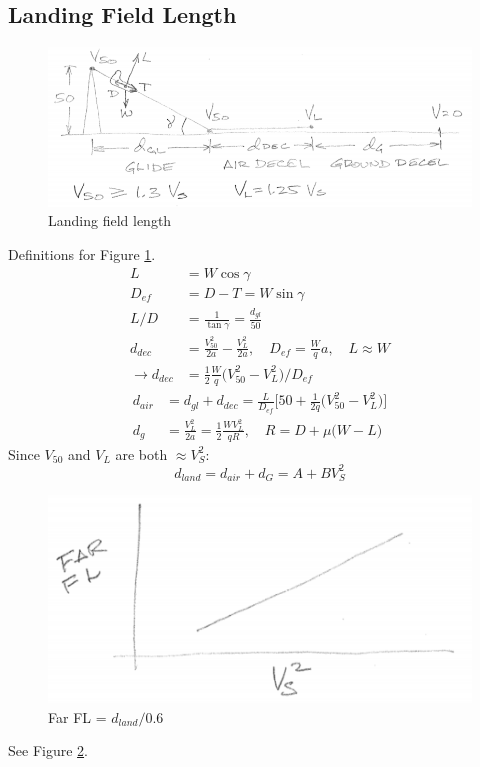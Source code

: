 \documentclass[draft=false, titlepage]{article}
\begin{document}
\subsection{Landing Field Length}
\begin{figure}[ht]
	\centering
	\includegraphics[width=0.8\linewidth]{Figures/p101_landing.PNG}
	\caption{Landing field length}
	\label{fig:p101_landing}
\end{figure}
Definitions for Figure \ref{fig:p101_landing}.
\begin{align*}
L &= W\cos\gamma\\
D_{ef} &= D-T = W\sin\gamma\\
L/D &= \frac{1}{\tan\gamma} = \frac{d_{gl}}{50}\\
d_{dec} &= \frac{V^2_{50}}{2a} - \frac{V_L^2}{2a},\quad D_{ef} = \frac{W}{q}a,\quad L\approx W\\
\rightarrow d_{dec} &= \frac{1}{2} \frac{W}{q} \Big(V_{50}^2 - V_L^2\Big)/D_{ef}
\end{align*}
\begin{align*}
d_{air} &= d_{gl} + d_{dec} = \frac{L}{D_{ef}} \Big[50 + \frac{1}{2q} \Big( V_{50}^2 - V_L^2 \Big)\Big]\\
d_g &= \frac{V_L^2}{2a} = \frac{1}{2}\frac{WV_L^2}{qR},\quad R=D+\mu\big(W-L\big)
\end{align*}
Since $V_{50}$ and $V_L$ are both $\approx V_S^2$:
\begin{equation*}
d_{land} = d_{air} + d_G = A + BV_S^2
\end{equation*}
\begin{figure}[ht]
	\centering
	\includegraphics[width=0.4\linewidth]{Figures/p101_farFl.PNG}
	\caption{Far FL = $d_{land}/0.6$}
	\label{fig:p101_farFl}
\end{figure}
See Figure \ref{fig:p101_farFl}.
\end{document}
